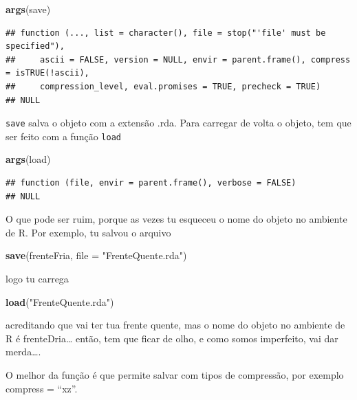 \documentclass[]{book}
\newenvironment{Shaded}{\begin{snugshade}}{\end{snugshade}}
\newcommand{\KeywordTok}[1]{\textcolor[rgb]{0.13,0.29,0.53}{\textbf{#1}}}
\newcommand{\DataTypeTok}[1]{\textcolor[rgb]{0.13,0.29,0.53}{#1}}
\newcommand{\StringTok}[1]{\textcolor[rgb]{0.31,0.60,0.02}{#1}}
\newcommand{\NormalTok}[1]{#1}
\begin{document}
\begin{Shaded}
\begin{Highlighting}[]
\KeywordTok{args}\NormalTok{(save)}
\end{Highlighting}
\end{Shaded}

\begin{verbatim}
## function (..., list = character(), file = stop("'file' must be specified"), 
##     ascii = FALSE, version = NULL, envir = parent.frame(), compress = isTRUE(!ascii), 
##     compression_level, eval.promises = TRUE, precheck = TRUE) 
## NULL
\end{verbatim}

\texttt{save} salva o objeto com a extensão .rda. Para carregar de volta
o objeto, tem que ser feito com a função \texttt{load}

\begin{Shaded}
\begin{Highlighting}[]
\KeywordTok{args}\NormalTok{(load)}
\end{Highlighting}
\end{Shaded}

\begin{verbatim}
## function (file, envir = parent.frame(), verbose = FALSE) 
## NULL
\end{verbatim}

O que pode ser ruim, porque as vezes tu esqueceu o nome do objeto no
ambiente de R. Por exemplo, tu salvou o arquivo

\begin{Shaded}
\begin{Highlighting}[]
\KeywordTok{save}\NormalTok{(frenteFria, }\DataTypeTok{file =} \StringTok{"FrenteQuente.rda"}\NormalTok{)}
\end{Highlighting}
\end{Shaded}

logo tu carrega

\begin{Shaded}
\begin{Highlighting}[]
\KeywordTok{load}\NormalTok{(}\StringTok{"FrenteQuente.rda"}\NormalTok{)}
\end{Highlighting}
\end{Shaded}

acreditando que vai ter tua frente quente, mas o nome do objeto no
ambiente de R é frenteDria\ldots{} então, tem que ficar de olho, e como
somos imperfeito, vai dar merda\ldots{}.

O melhor da função é que permite salvar com tipos de compressão, por
exemplo compress = ``xz''.
\end{document}
